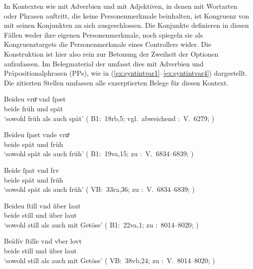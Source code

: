 In Kontexten wie  mit Adverbien und
 mit Adjektiven, in denen  mit Wortarten oder Phrasen auftritt, die keine
Personenmerkmale beinhalten, ist Kongruenz von 
mit seinen Konjunkten an sich ausgeschlossen. Die Konjunkte definieren in
diesen Fällen weder ihre eigenen Personen\-merkmale, noch spiegeln sie als
Kongruenztargets die Personenmerkmale eines Controllers\is{Controller} wider.
Die Konstruktion ist hier also rein zur Betonung der Zweiheit der Optionen
aufzufassen. Im Belegmaterial der \KC{} umfasst dies 
mit Adverbien und Präpositionalphrasen\is{Präpositionalphrase} (PPs), wie in
(\ref{ex:syntintvar1}--\ref{ex:syntintvar4}) dargestellt. Die zitierten Stellen
umfassen alle exzerptierten Belege für diesen Kontext.

\begin{exe}
\ex \label{ex:syntintvar1}
	\begin{xlist}
	\ex \gll Beideu vruͦ vnd ſpæt \\
		beide früh und spät \\
		\trans `sowohl früh als auch spät'
		(%
			B1:~18rb,5; vgl.~abweichend
			\KC:~V.~6279;
			\cite[196]{schroeder1895}%
		)

	\ex \gll Beideu ſpæt vnde vruͦ \\
		beide spät und früh \\
		\trans `sowohl spät als auch früh'
		(%
			B1:~19va,15; zu
			\KC:~V.~6834--6839;
			\cite[206]{schroeder1895}%
		)

	\ex \label{ex:syntintvar1_3}
	\gll Beide ſpat vnd frv \\
		beide spät und früh \\
		\trans `sowohl spät als auch früh'
			(%
				VB:~33ra,36; zu
				\KC:~V.~6834--6839;
				\cite[206]{schroeder1895}%
			)
\end{xlist}

\ex \label{ex:syntintvar3}
	\begin{xlist}
	\ex \gll Beideu ſtill vnd ûber laut \\
		beide still und über laut \\
		\trans `sowohl still als auch mit Getöse'
			(%
				B1:~22va,1; zu
				\KC:~8014--8020;
				\cite[228]{schroeder1895}%
			)

	\ex \label{ex:syntintvar3_2}
		\gll Beídív ſtille vnd vber lovt \\
		beide still und über laut \\
		\trans `sowohl still als auch mit Getöse'
			(%
				VB:~38vb,24; zu
				\KC:~V.~8014--8020;
				\cite[228]{schroeder1895}%
			)
\end{xlist}
\end{exe}

